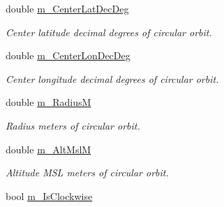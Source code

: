 \begin{DoxyCompactItemize}
\item 
\hypertarget{class_circular_orbit_belief_a89ec0a3cda8792afcae2d6d86bcba586}{
double \hyperlink{class_circular_orbit_belief_a89ec0a3cda8792afcae2d6d86bcba586}{m\_\-CenterLatDecDeg}}
\label{class_circular_orbit_belief_a89ec0a3cda8792afcae2d6d86bcba586}

\begin{DoxyCompactList}\small\item\em Center latitude decimal degrees of circular orbit. \end{DoxyCompactList}\item 
\hypertarget{class_circular_orbit_belief_adba1bec3bae4c5d359e2f98097fe4d17}{
double \hyperlink{class_circular_orbit_belief_adba1bec3bae4c5d359e2f98097fe4d17}{m\_\-CenterLonDecDeg}}
\label{class_circular_orbit_belief_adba1bec3bae4c5d359e2f98097fe4d17}

\begin{DoxyCompactList}\small\item\em Center longitude decimal degrees of circular orbit. \end{DoxyCompactList}\item 
\hypertarget{class_circular_orbit_belief_ae2611494d76755888fa6e81a6b4e1bab}{
double \hyperlink{class_circular_orbit_belief_ae2611494d76755888fa6e81a6b4e1bab}{m\_\-RadiusM}}
\label{class_circular_orbit_belief_ae2611494d76755888fa6e81a6b4e1bab}

\begin{DoxyCompactList}\small\item\em Radius meters of circular orbit. \end{DoxyCompactList}\item 
\hypertarget{class_circular_orbit_belief_a27ccb23eb9c6cedf81b5c8d0fd5032fc}{
double \hyperlink{class_circular_orbit_belief_a27ccb23eb9c6cedf81b5c8d0fd5032fc}{m\_\-AltMslM}}
\label{class_circular_orbit_belief_a27ccb23eb9c6cedf81b5c8d0fd5032fc}

\begin{DoxyCompactList}\small\item\em Altitude MSL meters of circular orbit. \end{DoxyCompactList}\item 
\hypertarget{class_circular_orbit_belief_aaa06b661a3f8333a88f194f7613bfe10}{
bool \hyperlink{class_circular_orbit_belief_aaa06b661a3f8333a88f194f7613bfe10}{m\_\-IsClockwise}}
\label{class_circular_orbit_belief_aaa06b661a3f8333a88f194f7613bfe10}


\end{DoxyCompactItemize}
